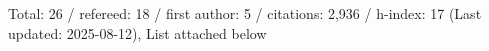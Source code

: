 Total: 26 / refereed: 18 / first author: 5 / citations: 2,936 / h-index: 17 (Last updated: 2025-08-12), List attached below